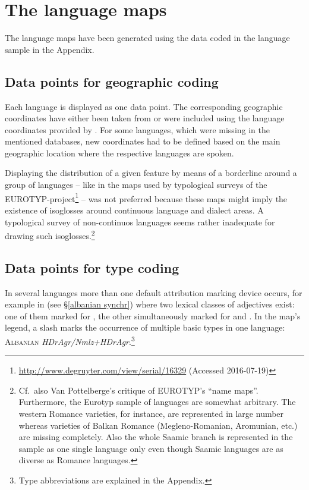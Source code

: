 \section{The language maps}
The language maps have been generated using the data coded in the language sample in the Appendix.

\subsection[Geographic coding]{Data points for geographic coding}
Each language is displayed as one data point. The corresponding geographic coordinates have either been taken from \citet{walsOnline2013} or were included using the language coordinates provided by \citet{AUTOTYP}. For some languages, which were missing in the mentioned databases, new coordinates had to be defined based on the main geographic location where the respective languages are spoken.

Displaying the distribution of a given feature by means of a borderline around a group of languages – like in the maps used by typological surveys of the EUROTYP\hyp{}project\footnote{\url{http://www.degruyter.com/view/serial/16329} (Accessed 2016-07-19)} – was not preferred because these maps might imply the existence of isoglosses around continuous language and dialect areas. A typological survey of non-continuos languages seems rather inadequate for drawing such isoglosses.\footnote{Cf.~also Van Pottelberge's \citeyear{van-pottelberge2001} critique of EUROTYP's “name maps”. Furthermore, the Eurotyp sample of languages are somewhat arbitrary. The western Romance varieties, for instance, are represented in large number whereas varieties of Balkan Romance (Megleno-Romanian, Aromunian, etc.) are missing completely. Also the whole Saamic branch is represented in the  sample as one single language only even though Saamic languages are as diverse as Romance languages.}

\subsection[Type coding]{Data points for type coding}
In several languages more than one default attribution marking device occurs, for example in  (see \S\ref{albanian synchr}) where two lexical classes of adjectives exist: one of them marked for , the other simultaneously marked for  and . In the map's legend, a slash marks the occurrence of multiple basic types in one language: \textsc{Albanian} \textit{HDrAgr/Nmlz+HDrAgr}.\footnote{Type abbreviations are explained in the Appendix.}

